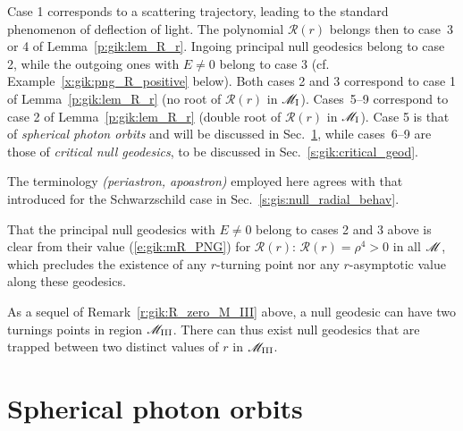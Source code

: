 Case 1 corresponds to a scattering trajectory, leading to the standard phenomenon of deflection of light. The polynomial $\mathcal{R}(r)$
belongs then to case~3 or 4 of Lemma~\ref{p:gik:lem_R_r}.
Ingoing principal null geodesics belong to case 2, while the outgoing ones with $E\neq 0$ belong to case 3
(cf. Example~\ref{x:gik:png_R_positive} below).
Both cases 2 and 3 correspond to case 1 of Lemma~\ref{p:gik:lem_R_r} (no root of $\mathcal{R}(r)$ in $\mathscr{M}_{\rm I}$).
Cases~5--9 correspond to case 2 of Lemma~\ref{p:gik:lem_R_r} (double root of $\mathcal{R}(r)$ in $\mathscr{M}_{\rm I}$).
Case 5 is that of \emph{spherical photon orbits} and will be discussed in Sec.~\ref{s:gik:spherical_orbits}, while cases~6--9 are those of \emph{critical null geodesics},
to be discussed in Sec.~\ref{s:gik:critical_geod}.

\begin{remark}
The terminology  \emph{(periastron, apoastron)} employed here agrees with that
introduced for the Schwarzschild case in Sec.~\ref{s:gis:null_radial_behav}.
\end{remark}

\begin{example} \label{x:gik:png_R_positive}
That the principal null geodesics with $E\neq 0$ belong to cases 2 and 3 above
is clear from their value (\ref{e:gik:mR_PNG}) for $\mathcal{R}(r)$:
$\mathcal{R}(r) = \rho^4 > 0$ in all $\mathscr{M}$, which precludes the existence
of any $r$-turning point nor any $r$-asymptotic value along these geodesics.
\end{example}

\begin{remark}
As a sequel of Remark~\ref{r:gik:R_zero_M_III} above, a null geodesic can have
two turnings points in region $\mathscr{M}_{\rm III}$. There can thus exist null geodesics that are trapped
between two distinct values of $r$ in $\mathscr{M}_{\rm III}$.
\end{remark}




\section{Spherical photon orbits} \label{s:gik:spherical_orbits}

